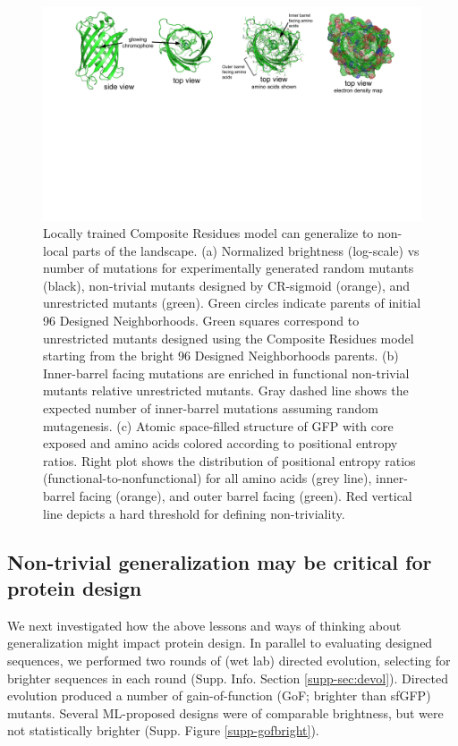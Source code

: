 \begin{figure}
  \includegraphics[width=1\linewidth,page=4,trim={0cm 5cm 0cm 0}]{figures/2018-05-09-NIPS_2018_Figures.pdf}
  \caption[Locally trained Composite Residues model can generalize to non-local parts of the landscape]{\small{Locally trained Composite Residues model can generalize to non-local parts of the landscape.
    (a) Normalized brightness (log-scale) vs number of mutations for experimentally generated random mutants (black), non-trivial mutants designed by CR-sigmoid (orange), and unrestricted mutants (green). Green circles indicate parents of initial 96 Designed Neighborhoods. Green squares correspond to unrestricted mutants designed using the Composite Residues model starting from the bright 96 Designed Neighborhoods parents. (b)  Inner-barrel facing mutations are enriched in functional non-trivial mutants relative unrestricted mutants.  Gray dashed line shows the expected number of inner-barrel mutations assuming random mutagenesis. (c) Atomic space-filled structure of GFP with core exposed and amino acids colored according to positional entropy ratios. Right plot shows the distribution of positional entropy ratios (functional-to-nonfunctional) for all amino acids (grey line), inner-barrel facing (orange), and outer barrel facing (green). Red vertical line depicts a hard threshold for defining non-triviality.}}
  \label{fig-generalization}
  \vspace{-0.6cm}
\end{figure}

\subsection{Non-trivial generalization may be critical for protein design}

We next investigated how the above lessons and ways of thinking about generalization might impact protein design. In parallel to evaluating designed sequences, we performed two rounds of (wet lab) directed evolution, selecting for brighter sequences in each round (Supp. Info. Section \ref{supp-sec:devol}). Directed evolution produced a number of gain-of-function (GoF; brighter than sfGFP) mutants. Several ML-proposed designs were of comparable brightness, but were not statistically brighter (Supp. Figure \ref{supp-gofbright}).

